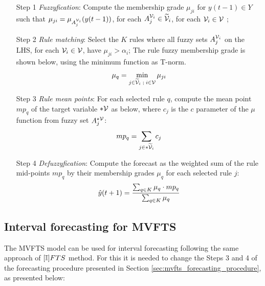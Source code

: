 \begin{enumerate} 
\item [Step 1] \textit{Fuzzyfication}: Compute the membership grade $\mu_{ji}$ for $y(t-1) \in Y$ such that $\mu_{ji} = \mu_{A_j^{\mathcal{V}_i}}(y(t-1))$, for each $A_j^{\mathcal{V}_i} \in \widetilde{\mathcal{V}}_i$, for each $\mathcal{V}_i \in \mathcal{V}$ ;
\item [Step 2] \textit{Rule matching}: Select the $K$ rules where all fuzzy sets $A_j^{\mathcal{V}_i}$ on the LHS, for each $\mathcal{V}_i \in \mathcal{V}$, have $\mu_{ji} > \alpha_i$; The rule fuzzy membership grade is shown below, using the minimum function as T-norm.
\begin{equation}
    \mu_q = \min_{j \in \widetilde{\mathcal{V}}_i\; ; \; i \in \mathcal{V}} \mu_{ji}
\end{equation}
\item [Step 3] \textit{Rule mean points}: For each selected rule $q$, compute the mean point $mp_q$ of the target variable $*\mathcal{V}$ as below, where $c_j$ is the $c$ parameter of the $\mu$ function from fuzzy set $A_j^{*\mathcal{V}}$:
\begin{equation}
mp_q = \sum_{j \in *\widetilde{\mathcal{V}}_i} c_j
\end{equation}
\item [Step 4] \textit{Defuzzyfication}: Compute the forecast as the weighted sum of the rule mid-points $mp_q$ by their membership grades $\mu_q$ for each selected rule $j$:
\begin{equation}
\hat{y}(t+1) = \frac{\sum_{q \in K} \mu_q \cdot mp_q}{\sum_{q \in K} \mu_q}
\end{equation}
\end{enumerate}

\subsection{Interval forecasting for MVFTS}
\label{sec:mvfts_interval}

The MVFTS model can be used for interval forecasting following the same approach of $[\mathbb{I}]FTS$ method. For this it is needed to change the Steps 3 and 4 of the forecasting procedure presented in Section \ref{sec:mvfts_forecasting_procedure}, as presented below:

